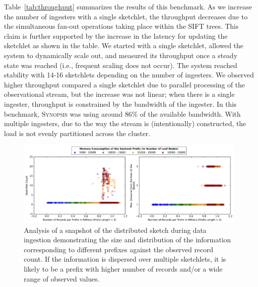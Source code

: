 \documentclass[9pt,journal,compsoc]{IEEEtran}
\begin{document}
Table~\ref{tab:throughput} summarizes the results of this benchmark.
As we increase the number of ingesters with a single sketchlet, the throughput decreases due to the simultaneous fan-out operations taking place within the SIFT trees. This claim is further supported by the increase in the latency for updating the sketchlet as shown in the table.  We started with a single sketchlet, allowed the system to dynamically scale out, and measured its throughput once a steady state was reached (i.e., frequent scaling does not occur).
The system reached stability with 14-16 sketchlets depending on the number of ingesters.
We observed higher throughput compared a single sketchlet due to parallel processing of the observational stream, but the increase was not linear; when there is a single ingester, throughput is constrained by the bandwidth of the ingester. In this benchmark, \textsc{Synopsis} was using around 86\% of the available bandwidth.
With multiple ingesters, due to the way the stream is (intentionally) constructed, the load is not evenly partitioned across the cluster.%
%
\begin{figure}
    \centerline{\includegraphics[width=\linewidth]{figures/scaleout_graph_analysis.pdf}}
    \caption{Analysis of a snapshot of the distributed sketch during data ingestion demonstrating the size and distribution of the information corresponding to different prefixes against the observed record count. If the information is dispersed over multiple sketchlets, it is likely to be a prefix with higher number of records and/or a wide range of observed values.}
    \label{fig:scaleout-graph-analysis}
\end{figure}
%
\end{document}
